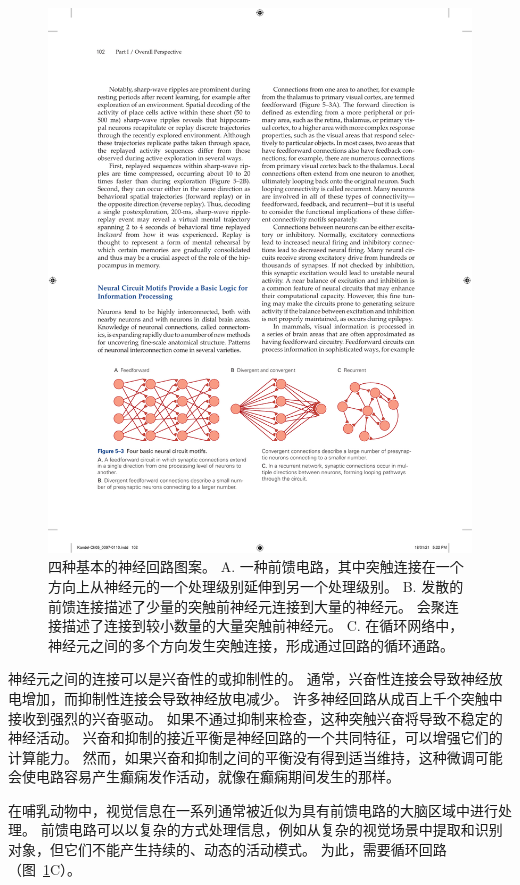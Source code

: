 \begin{figure}[htbp]
	\centering
	\includegraphics[width=1.0\linewidth]{chap05/fig_5_3}
	\caption{四种基本的神经回路图案。 
		A. 一种前馈电路，其中突触连接在一个方向上从神经元的一个处理级别延伸到另一个处理级别。 
		B. 发散的前馈连接描述了少量的突触前神经元连接到大量的神经元。 会聚连接描述了连接到较小数量的大量突触前神经元。 
		C. 在循环网络中，神经元之间的多个方向发生突触连接，形成通过回路的循环通路。}
	\label{fig:5_3}
\end{figure}


神经元之间的连接可以是兴奋性的或抑制性的。
通常，兴奋性连接会导致神经放电增加，而抑制性连接会导致神经放电减少。
许多神经回路从成百上千个突触中接收到强烈的兴奋驱动。
如果不通过抑制来检查，这种突触兴奋将导致不稳定的神经活动。
兴奋和抑制的接近平衡是神经回路的一个共同特征，可以增强它们的计算能力。
然而，如果兴奋和抑制之间的平衡没有得到适当维持，这种微调可能会使电路容易产生癫痫发作活动，就像在癫痫期间发生的那样。


在哺乳动物中，视觉信息在一系列通常被近似为具有前馈电路的大脑区域中进行处理。
前馈电路可以以复杂的方式处理信息，例如从复杂的视觉场景中提取和识别对象，但它们不能产生持续的、动态的活动模式。 
为此，需要循环回路（图~\ref{fig:5_3}C）。


